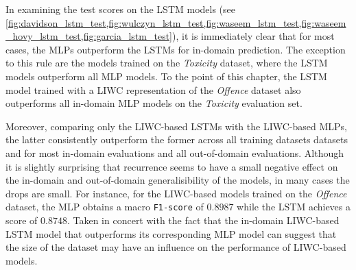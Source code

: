 In examining the test scores on the LSTM models (see \cref{fig:davidson_lstm_test,fig:wulczyn_lstm_test,fig:waseem_lstm_test,fig:waseem_hovy_lstm_test,fig:garcia_lstm_test}), it is immediately clear that for most cases, the MLPs outperform the LSTMs for in-domain prediction. The exception to this rule are the models trained on the \textit{Toxicity} dataset, where the LSTM models outperform all MLP models.
To the point of this chapter, the LSTM model trained with a LIWC representation of the \textit{Offence} dataset also outperforms all in-domain MLP models on the \textit{Toxicity} evaluation set.

Moreover, comparing only the LIWC-based LSTMs with the LIWC-based MLPs, the latter consistently outperform the former across all training datasets datasets and for most in-domain evaluations and all out-of-domain evaluations. Although it is slightly surprising that recurrence seems to have a small negative effect on the in-domain and out-of-domain generalisibility of the models, in many cases the drops are small. For instance, for the LIWC-based models trained on the \textit{Offence} dataset, the MLP obtains a macro \texttt{F1-score} of $0.8987$ while the LSTM achieves a score of $0.8748$. Taken in concert with the fact that the in-domain LIWC-based LSTM model that outperforms its corresponding MLP model can suggest that the size of the dataset may have an influence on the performance of LIWC-based models.

